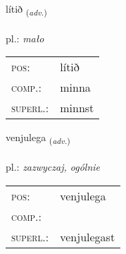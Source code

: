 \documentclass[frontgrid, backgrid]{flacards}\usepackage[]{graphicx}\usepackage[]{xcolor}
\begin{document}
\renewcommand{\flhead}{\vskip5pt \fboxsep=0pt {\small\bfseries\footnotesize Atviksorð | Adverb}}
\renewcommand{\fcfoot}{\vskip5pt \fboxsep=0pt \hspace{2pt}{\small\bfseries\footnotesize 2K}}

\renewcommand{\blhead}{\vskip5pt {\small\bfseries\footnotesize Atviksorð | Adverb }}
\renewcommand{\bcfoot}{\vskip5pt \hspace{2pt}{\small\bfseries\footnotesize 2K}}


{lítið \small{\textsubscript{(\textit{adv.})}} \\[1ex] %
\textphonetic{[liːtɪð]} \\
pl.: \emph{mało} \\  [2ex]
\renewcommand*{\arraystretch}{0.8}
\begin{tabular}{ll}
\textsc{pos}: & lítið \\ 
\textsc{comp.}: & minna \\ 
\textsc{superl.}: & minnst \\
\end{tabular}
}

\renewcommand{\flhead}{\vskip5pt \fboxsep=0pt {\small\bfseries\footnotesize Atviksorð | Adverb}}
\renewcommand{\fcfoot}{\vskip5pt \fboxsep=0pt \hspace{2pt}{\small\bfseries\footnotesize 2K}}

\renewcommand{\blhead}{\vskip5pt {\small\bfseries\footnotesize Atviksorð | Adverb }}
\renewcommand{\bcfoot}{\vskip5pt \hspace{2pt}{\small\bfseries\footnotesize 2K}}


{venjulega \small{\textsubscript{(\textit{adv.})}} \\[1ex] %
\textphonetic{[vɛnjʏlɛɣa]} \\
pl.: \emph{zazwyczaj, ogólnie} \\  [2ex]
\renewcommand*{\arraystretch}{0.8}
\begin{tabular}{ll}
\textsc{pos}: & venjulega \\ 
\textsc{comp.}: &  \\ 
\textsc{superl.}: & venjulegast \\
\end{tabular}
}
\end{document}
